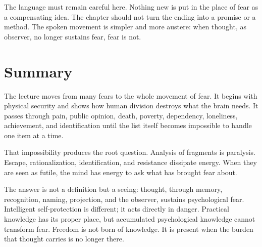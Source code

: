 The language must remain careful here. Nothing new is put in the place of fear as a compensating idea. The chapter should not turn the ending into a promise or a method. The spoken movement is simpler and more austere: when thought, as observer, no longer sustains fear, fear is not.

\section{Summary}

The lecture moves from many fears to the whole movement of fear. It begins with physical security and shows how human division destroys what the brain needs. It passes through pain, public opinion, death, poverty, dependency, loneliness, achievement, and identification until the list itself becomes impossible to handle one item at a time.

That impossibility produces the root question. Analysis of fragments is paralysis. Escape, rationalization, identification, and resistance dissipate energy. When they are seen as futile, the mind has energy to ask what has brought fear about.

The answer is not a definition but a seeing: thought, through memory, recognition, naming, projection, and the observer, sustains psychological fear. Intelligent self-protection is different; it acts directly in danger. Practical knowledge has its proper place, but accumulated psychological knowledge cannot transform fear. Freedom is not born of knowledge. It is present when the burden that thought carries is no longer there.